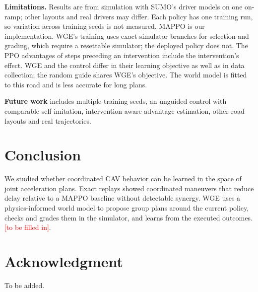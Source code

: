 \documentclass[conference]{IEEEtran}
\newcommand{\tbf}{\textcolor{red}{[to be filled in]}}
\begin{document}
\textbf{Limitations.} Results are from simulation with SUMO's driver models on one on-ramp; other layouts and real drivers may differ. Each policy has one training run, so variation across training seeds is not measured. MAPPO is our implementation. WGE's training uses exact simulator branches for selection and grading, which require a resettable simulator; the deployed policy does not. The PPO advantages of steps preceding an intervention include the intervention's effect. WGE and the control differ in their learning objective as well as in data collection; the random guide shares WGE's objective. The world model is fitted to this road and is less accurate for long plans.

\textbf{Future work} includes multiple training seeds, an unguided control with comparable self-imitation, intervention-aware advantage estimation, other road layouts and real trajectories.

\section{Conclusion}

We studied whether coordinated CAV behavior can be learned in the space of joint acceleration plans. Exact replays showed coordinated maneuvers that reduce delay relative to a MAPPO baseline without detectable synergy. WGE uses a physics-informed world model to propose group plans around the current policy, checks and grades them in the simulator, and learns from the executed outcomes. \tbf.

\section*{Acknowledgment}
To be added.



\end{document}
